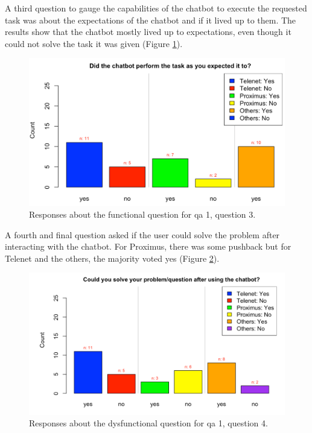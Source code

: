 \break
A third question to gauge the capabilities of the chatbot to execute the requested task was about the expectations of the chatbot and if it lived up to them. The results show that the chatbot mostly lived up to expectations, even though it could not solve the task it was given (Figure \ref{fig:Q1c}).\\
\begin{figure}[!htb]
	\centering
	\includegraphics[width=375pt]{../LaTeX/Figures/Comparative/Q1c.png}
	\caption{Responses about the functional question for \acrshort{qa} 1, question 3.}\label{fig:Q1c}
\end{figure}
\break
A fourth and final question asked if the user could solve the problem after interacting with the chatbot. For Proximus, there was some pushback but for Telenet and the others, the majority voted yes (Figure \ref{fig:DQ1c}).\\
\begin{figure}[!htb]
	\centering
	\includegraphics[width=375pt]{../LaTeX/Figures/Comparative/DQ1c.png}
	\caption{Responses about the dysfunctional question for \acrshort{qa} 1, question 4.}\label{fig:DQ1c}
\end{figure}
